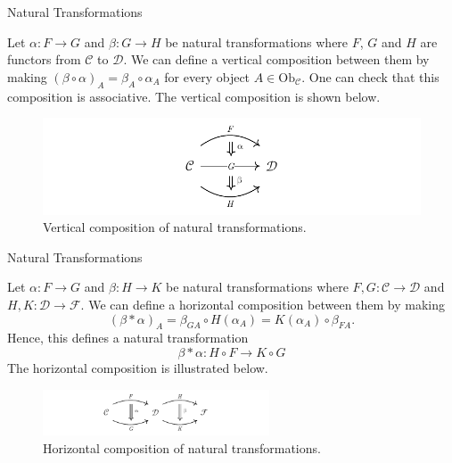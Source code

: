 \documentclass[aspectratio=169,xcolor=dvipsnames,10pt]{beamer}
\theoremstyle{definition}
\begin{document}
\begin{frame}[fragile]{Natural Transformations}
    \begin{definition}
        Let $\alpha: F \to G$ and $\beta: G \to H$ be natural transformations
        where $F$, $G$ and $H$ are functors from $\mathcal C$ to $\mathcal D$.
        We can define a vertical composition between them by making
        $(\beta \circ \alpha)_A = \beta_A \circ \alpha_A$ for every object $A \in \text{Ob}_\mathcal C$.
        One can check that this composition is associative.
        The vertical composition is shown below.
    \end{definition}

    \begin{figure}[H]
        \begin{center}
            \includegraphics{../notebooks/VerticalComposition.pdf}
        \end{center}
        \caption{Vertical composition of natural transformations.}
        \label{fig:verticalcomp}
    \end{figure}
\end{frame}

\begin{frame}[fragile]{Natural Transformations}
    \begin{definition}
        Let $\alpha: F \to G$ and $\beta: H \to K$ be natural transformations
        where $F, G: \mathcal C \to \mathcal D$ and $H, K: \mathcal D \to \mathcal F$.
        We can define a horizontal composition between them by making
        \begin{displaymath}
            (\beta * \alpha)_A = \beta_{GA} \circ H(\alpha_A) =  K(\alpha_A) \circ \beta_{FA}.
        \end{displaymath}
        Hence, this defines a natural transformation
        \begin{displaymath}
            \beta * \alpha: H \circ F \to K \circ G
        \end{displaymath}
        The horizontal composition is illustrated below.
    \end{definition}

    \begin{figure}[H]
        \begin{center}
            \includegraphics[width=0.60\textwidth]{../notebooks/HorizontalComposition.pdf}
        \end{center}
        \caption{Horizontal composition of natural transformations.}
        \label{fig:horizontalcomp}
    \end{figure}
\end{frame}
\end{document}
